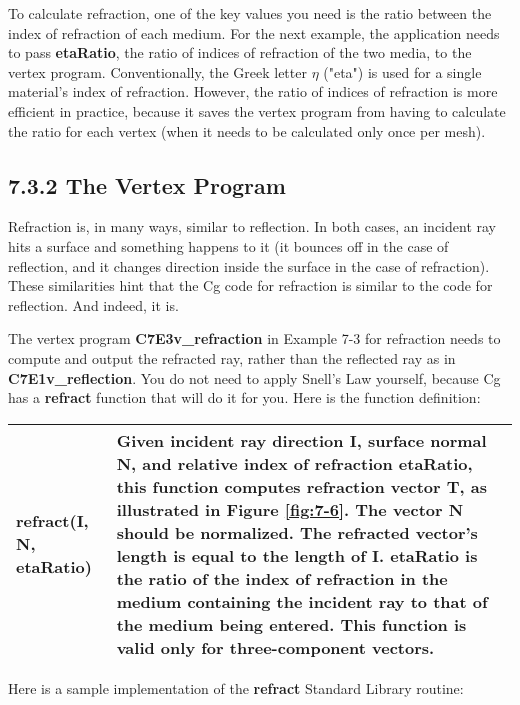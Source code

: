 \documentclass[../main.tex]{subfiles}
\begin{document}
To calculate refraction, one of the key values you need is the ratio between the index of refraction of each medium. For the next example, the application needs to pass \textbf{etaRatio}, the ratio of indices of refraction of the two media, to the vertex program. Conventionally, the Greek letter $\eta$ ("eta") is used for a single material's index of refraction. However, the ratio of indices of refraction is more efficient in practice, because it saves the vertex program from having to calculate the ratio for each vertex (when it needs to be calculated only once per mesh).

\subsection{7.3.2 The Vertex Program}

Refraction is, in many ways, similar to reflection. In both cases, an incident ray hits a surface and something happens to it (it bounces off in the case of reflection, and it changes direction inside the surface in the case of refraction). These similarities hint that the Cg code for refraction is similar to the code for reflection. And indeed, it is.

The vertex program \textbf{C7E3v_refraction} in Example 7-3 for refraction needs to compute and output the refracted ray, rather than the reflected ray as in \textbf{C7E1v_reflection}. You do not need to apply Snell's Law yourself, because Cg has a \textbf{refract} function that will do it for you. Here is the function definition:

\FloatBarrier
\begin{table}
\centering
\begin{tabular}{ p{4cm} p{10cm}  } 
\hline
\textbf{refract(I, N, etaRatio)} & Given incident ray direction \textbf{I}, surface normal \textbf{N}, and relative index of refraction \textbf{etaRatio}, this function computes refraction vector \textbf{T}, as illustrated in Figure \ref{fig:7-6}. The vector \textbf{N} should be normalized. The refracted vector's length is equal to the length of \textbf{I}. \textbf{etaRatio} is the ratio of the index of refraction in the medium containing the incident ray to that of the medium being entered. This function is valid only for three-component vectors. \\
\hline
\end{tabular}
\end{table}
\FloatBarrier

Here is a sample implementation of the \textbf{refract} Standard Library routine:
\end{document}
